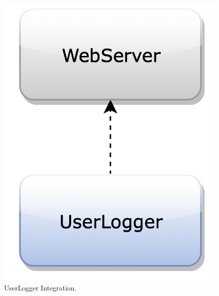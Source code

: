\begin{figure}[H]
\begin{center}
        \begin{minipage}[c]{.40\textwidth}
	\centering
\includegraphics[scale=0.35]{Images/IntegrationPlanImages/fig7.png}
\caption{UserLogger Integration.}
        \end{minipage}%
        \hspace{10mm}%
        \begin{minipage}[c]{.40\textwidth}
	\centering

\end{minipage}
\end{center}
\end{figure}
